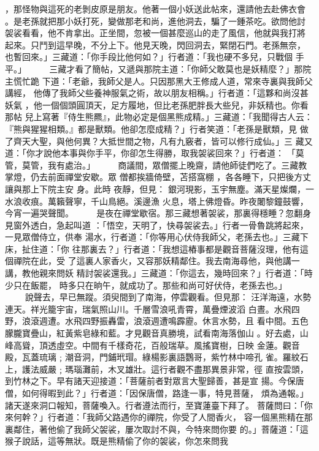 \begin{pinyinscope}
{，那怪物與這死的老剝皮原是朋友。他著一個小妖送此帖來，還請他去赴佛衣會
。是老孫就把那小妖打死，變做那老和尚，進他洞去，騙了一鍾茶吃。欲問他討
袈裟看看，他不肯拿出。正坐間，忽被一個甚麼巡山的走了風信，他就與我打將
起來。只鬥到這早晚，不分上下。他見天晚，閃回洞去，緊閉石門。老孫無奈，
也暫回來。」三藏道：「你手段比他何如？」行者道：「我也硬不多兒，只戰個
手平。」
　　
三藏才看了簡帖，又遞與那院主道：「你師父敢莫也是妖精麼？」那院主慌忙跪
下道：「老爺，我師父是人。只因那黑大王修成人道，常來寺裏與我師父講經，
他傳了我師父些養神服氣之術，故以朋友相稱。」行者道：「這夥和尚沒甚妖氣
，他一個個頭圓頂天，足方履地，但比老孫肥胖長大些兒，非妖精也。你看那帖
兒上寫著『侍生熊羆』，此物必定是個黑熊成精。」三藏道：「我聞得古人云：
『熊與猩猩相類。』都是獸類。他卻怎麼成精？」行者笑道：「老孫是獸類，見
做了齊天大聖，與他何異？大抵世間之物，凡有九竅者，皆可以修行成仙。」三
藏又道：「你才說他本事與你手平，你卻怎生得勝，取我袈裟回來？」行者道：
「莫管，莫管，我有處治。」
　　
商議間，眾僧擺上晚齋，請他師徒們吃了。三藏教掌燈，仍去前面禪堂安歇。眾
僧都挨牆倚壁，苫搭窩棚 ，各各睡下，只把後方丈讓與那上下院主安 身。此時
夜靜，但見：
銀河現影，玉宇無塵。滿天星燦爛，一水浪收痕。萬籟聲寧，千山鳥絕。溪邊漁
火息，塔上佛燈昏。昨夜闍黎鐘鼓響，今宵一遍哭聲聞。
　　
是夜在禪堂歇宿。那三藏想著袈裟，那裏得穩睡？忽翻身見窗外透白，急起叫道
：「悟空，天明了，快尋袈裟去。」行者一骨魯跳將起來，一見眾僧侍立，供奉
湯水，行者道：「你等用心伏侍我師父，老孫去也。」三藏下床，扯住道：「你
往那裏去？」行者道：「我想這樁事都是觀音菩薩沒理，他有這個禪院在此，受
了這裏人家香火，又容那妖精鄰住。我去南海尋他，與他講一講，教他親來問妖
精討袈裟還我。」三藏道：「你這去，幾時回來？」行者道：「時少只在飯罷，
時多只在晌午，就成功了。那些和尚可好伏侍，老孫去也。」
　　
說聲去，早已無蹤。須臾間到了南海，停雲觀看。但見那：
汪洋海遠，水勢連天。祥光籠宇宙，瑞氣照山川。千層雪浪吼青霄，萬疊煙波滔
白晝。水飛四野，浪滾週遭。水飛四野振轟雷，浪滾週遭鳴霹靂。休言水勢，且
看中間。五色朦朧寶疊山，紅黃紫皂綠和藍。才見觀音真勝境，試看南海落伽山
。好去處，山峰高聳，頂透虛空。中間有千樣奇花，百般瑞草。風搖寶樹，日映
金蓮。觀音殿，瓦蓋琉璃﹔潮音洞，門鋪玳瑁。綠楊影裏語鸚哥，紫竹林中啼孔
雀。羅紋石上，護法威嚴﹔瑪瑙灘前，木叉雄壯。這行者觀不盡那異景非常，徑
直按雲頭，到竹林之下。早有諸天迎接道：「菩薩前者對眾言大聖歸善，甚是宣
揚。今保唐僧，如何得暇到此？」行者道：「因保唐僧，路逢一事，特見菩薩，
煩為通報。」諸天遂來洞口報知，菩薩喚入。行者遵法而行，至寶蓮臺下拜了。
菩薩問曰：「你來何幹？」行者道：「我師父路遇你的禪院，你受了人間香火，
容一個黑熊精在那裏鄰住，著他偷了我師父袈裟，屢次取討不與，今特來問你要
的。」菩薩道：「這猴子說話，這等無狀。既是熊精偷了你的袈裟，你怎來問我
}
\end{pinyinscope}
